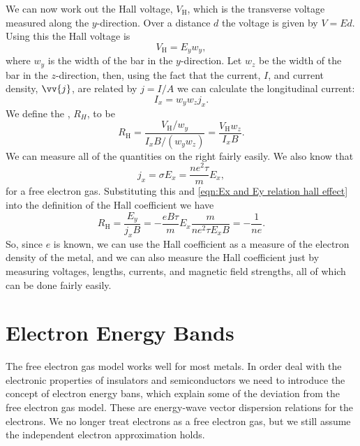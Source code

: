 \documentclass[fleqn]{NotesClass}
\newcommand*{\hall}{\mathrm{H}}
\begin{document}
    We can now work out the Hall voltage, \(V_{\hall}\), which is the transverse voltage measured along the \(y\)-direction.
    Over a distance \(d\) the voltage is given by \(V = Ed\).
    Using this the Hall voltage is 
    \begin{equation}
        V_{\hall} = E_yw_y,
    \end{equation}
    where \(w_y\) is the width of the bar in the \(y\)-direction.
    Let \(w_z\) be the width of the bar in the \(z\)-direction, then, using the fact that the current, \(I\), and current density, \(\vv{j}\), are related by \(j = I/A\) we can calculate the longitudinal current:
    \begin{equation}
        I_x = w_yw_z j_x.
    \end{equation}
    We define the , \(R_H\), to be
    \begin{equation}
        R_{\hall} = \frac{V_{\hall}/w_y}{I_xB/(w_yw_z)} = \frac{V_{\hall}w_z}{I_xB}.
    \end{equation}
    We can measure all of the quantities on the right fairly easily.
    We also know that
    \begin{equation}
        j_x = \sigma E_x = \frac{ne^2\tau}{m}E_x,
    \end{equation}
    for a free electron gas.
    Substituting this and \cref{eqn:Ex and Ey relation hall effect} into the definition of the Hall coefficient we have
    \begin{equation}
        R_{\hall} = \frac{E_y}{j_xB} = -\frac{eB\tau}{m}E_x \frac{m}{ne^2\tau E_x B} = -\frac{1}{ne}.
    \end{equation}
    So, since \(e\) is known, we can use the Hall coefficient as a measure of the electron density of the metal, and we can also measure the Hall coefficient just by measuring voltages, lengths, currents, and magnetic field strengths, all of which can be done fairly easily.
    
    \chapter{Electron Energy Bands}
    The free electron gas model works well for most metals.
    In order deal with the electronic properties of insulators and semiconductors we need to introduce the concept of electron energy bans, which explain some of the deviation from the free electron gas model.
    These are energy-wave vector dispersion relations for the electrons.
    We no longer treat electrons as a free electron gas, but we still assume the independent electron approximation holds.
    
\end{document}
